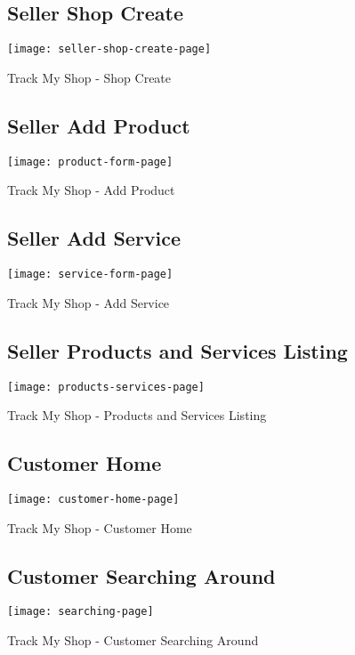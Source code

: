 \begin{figure}[h]
	\subsection{Seller Shop Create}
	\centering
	\texttt{[image: seller-shop-create-page]}
	\caption{Track My Shop - Shop Create}
\end{figure}
\newpage

\begin{figure}[h]
	\subsection{Seller Add Product}
	\centering
	\texttt{[image: product-form-page]}
	\caption{Track My Shop - Add Product}
\end{figure}

\begin{figure}[h]
	\subsection{Seller Add Service}
	\centering
	\texttt{[image: service-form-page]}
	\caption{Track My Shop - Add Service}
\end{figure}
\newpage

\begin{figure}[h]
	\subsection{Seller Products and Services Listing}
	\centering
	\texttt{[image: products-services-page]}
	\caption{Track My Shop - Products and Services Listing}
\end{figure}


\begin{figure}[h]
	\subsection{Customer Home}
	\centering
	\texttt{[image: customer-home-page]}
	\caption{Track My Shop - Customer Home}
\end{figure}
\newpage

\begin{figure}[h]
	\subsection{Customer Searching Around}
	\centering
	\texttt{[image: searching-page]}
	\caption{Track My Shop - Customer Searching Around}
\end{figure}


